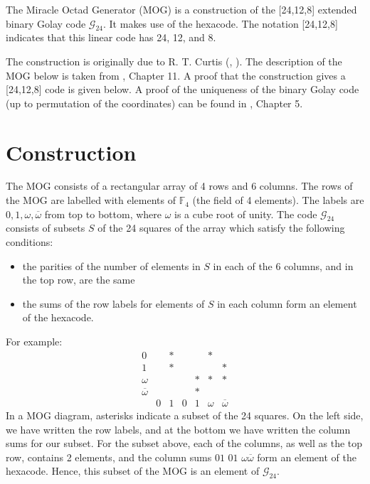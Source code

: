 \documentclass[12pt]{article}
\newcommand{\gc}{\mathcal{G}_{24}}
\newcommand{\F}{\mathbb{F}}
\newcommand{\w}{\omega}
\newcommand{\W}{\overline{\omega}}
\newcommand{\cw}[6]{#1#2\,\,#3#4\,\,#5#6}
\begin{document}

The Miracle Octad Generator (MOG) is a construction of the [24,12,8] extended binary Golay code $\gc$.  It makes use of the hexacode.  The notation [24,12,8] indicates that this linear code has  24,  12, and  8.  

The construction is originally due to R. T. Curtis (\cite{cur1}, \cite{cur2}).  The description of the MOG below is taken from \cite{splag}, Chapter 11.  A proof that the construction gives a [24,12,8] code is given below.  A proof of the uniqueness of the binary Golay code (up to permutation of the coordinates) can be found in \cite{sporadic}, Chapter 5. 

\section{Construction}

The MOG consists of a rectangular array of 4 rows and 6 columns.  The rows of the MOG are labelled with elements of $\F_4$ (the field of 4 elements).  The labels are $0,1,\w,\W$ from top to bottom, where $\w$ is a cube root of unity.  The code $\gc$ consists of subsets $S$ of the 24 squares of the array which satisfy the following conditions:
\begin{itemize}
\item{the parities of the number of elements in $S$ in each of the 6 columns, and in the top row, are the same}
\item{the sums of the row labels for elements of $S$ in each column form an element of the hexacode.}
\end{itemize}
For example:
$$\begin{array}{ccccccc}
0 &  &* &  &  &* &   \\
1 &  &* &  &  &  &*  \\
\w&  &  &  &* &* &*  \\
\W&  &  &  &* &  &   \\
  &0 &1 &0 &1 &\w&\W
\end{array}$$
In a MOG diagram, asterisks indicate a subset of the 24 squares.  On the left side, we have written the row labels, and at the bottom we have written the column sums for our subset.  For the subset above, each of the columns, as well as the top row, contains 2 elements, and the column sums $\cw{0}{1}{0}{1}{\w}{\W}$ form an element of the hexacode.  Hence, this subset of the MOG is an element of $\gc$.
\end{document}
